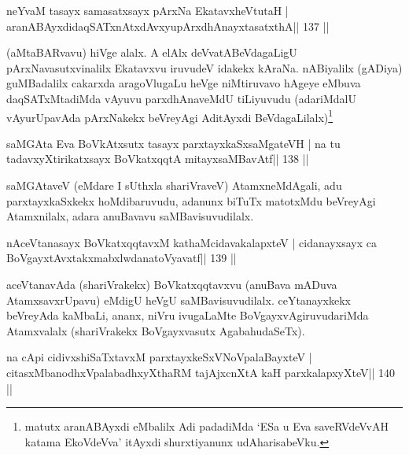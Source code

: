 \begin{shl}
neYvaM tasayx samasatxsayx pArxNa EkatavxheVtutaH |
aranABAyxdidaqSATxnAtxdAvxyupArxdhAnayxtasatxthA\hfill || 137 ||
\end{shl}

\begin{artha}
(aMtaBARvavu) hiVge alalx. A elAlx deVvatABeVdagaLigU 
pArxNavasutxvinalilx Ekatavxvu iruvudeV idakekx kAraNa. nABiyalilx 
(gADiya) guMBadalilx cakarxda aragoVlugaLu heVge niMtiruvavo hAgeye 
eMbuva daqSATxMtadiMda vAyuvu parxdhAnaveMdU tiLiyuvudu (adariMdalU 
vAyurUpavAda pArxNakekx beVreyAgi AditAyxdi 
BeVdagaLilalx)\footnote{matutx aranABAyxdi eMbalilx Adi padadiMda `ESa 
u Eva saveRVdeVvAH
 katama EkoVdeVva' itAyxdi shurxtiyanunx udAharisabeVku.}
\end{artha}


\begin{shl}
saMGAta Eva BoVkAtx\s sutx tasayx parxtayxkaSxsaMgateVH |
na tu tadavxyXtirikatxsayx BoVkatxqqtA mitayxsaMBavAtf\hfill || 138 ||
\end{shl}

\begin{artha}
saMGAtaveV (eMdare I sUthxla shariVraveV) AtamxneMdAgali, adu  parxtayxkaSxkekx hoMdibaruvudu, adanunx biTuTx matotxMdu beVreyAgi Atamxnilalx, adara anuBavavu saMBavisuvudilalx.
\end{artha}


\begin{shl}
nAceVtanasayx BoVkatxqqtavxM kathaMcidavakalapxteV |
cidanayxsayx ca BoVgayxtAvxtakxmabxlwdanatoVyavatf\hfill || 139 ||
\end{shl}

\begin{artha}
aceVtanavAda (shariVrakekx) BoVkatxqqtavxvu (anuBava mADuva  AtamxsavxrUpavu) eMdigU heVgU saMBavisuvudilalx.  ceYtanayxkekx beVreyAda kaMbaLi, ananx, niVru ivugaLaMte  BoVgayxvAgiruvudariMda Atamxvalalx (shariVrakekx BoVgayxvasutx AgabahudaSeTx).
\end{artha}

\begin{shl}
na cApi cidivxshiSaTxtavxM parxtayxkeSxVNoVpalaBayxteV |
citasxMbanodhxVpalabadhxyXthaRM tajAjxcnXtA kaH parxkalapxyXteV\hfill || 140 ||
\end{shl}


